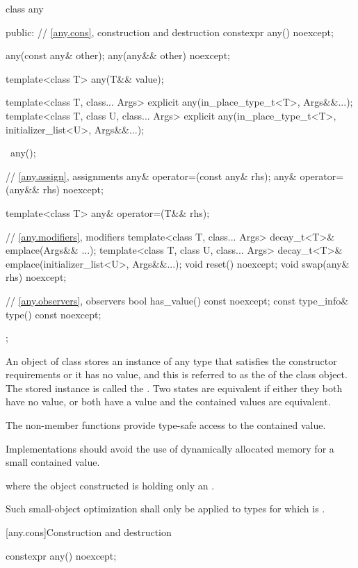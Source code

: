 \begin{codeblock}
class any {
public:
  // \ref{any.cons}, construction and destruction
  constexpr any() noexcept;

  any(const any& other);
  any(any&& other) noexcept;

  template<class T> any(T&& value);

  template<class T, class... Args>
    explicit any(in_place_type_t<T>, Args&&...);
  template<class T, class U, class... Args>
    explicit any(in_place_type_t<T>, initializer_list<U>, Args&&...);

  ~any();

  // \ref{any.assign}, assignments
  any& operator=(const any& rhs);
  any& operator=(any&& rhs) noexcept;

  template<class T> any& operator=(T&& rhs);

  // \ref{any.modifiers}, modifiers
  template<class T, class... Args>
    decay_t<T>& emplace(Args&& ...);
  template<class T, class U, class... Args>
    decay_t<T>& emplace(initializer_list<U>, Args&&...);
  void reset() noexcept;
  void swap(any& rhs) noexcept;

  // \ref{any.observers}, observers
  bool has_value() const noexcept;
  const type_info& type() const noexcept;
};
\end{codeblock}

\pnum
An object of class  stores an instance of any type that satisfies the constructor requirements or it has no value,
and this is referred to as the  of the class  object.
The stored instance is called the .
Two states are equivalent if either they both have no value, or both have a value and the contained values are equivalent.

\pnum
The non-member  functions provide type-safe access to the contained value.

\pnum
Implementations should avoid the use of dynamically allocated memory for a small contained value.
\begin{example}
where the object constructed is holding only an .
\end{example}
Such small-object optimization shall only be applied to types  for which
 is .

[any.cons]{Construction and destruction}

%
\begin{itemdecl}
constexpr any() noexcept;
\end{itemdecl}


